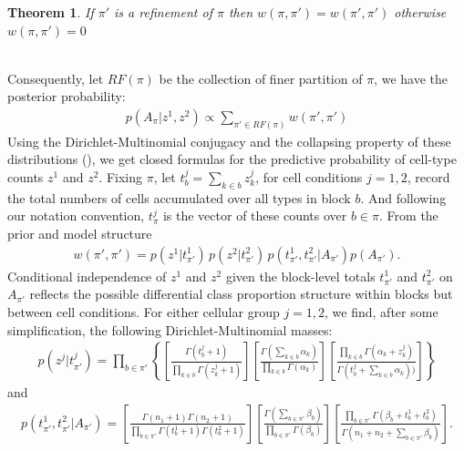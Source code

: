 \documentclass[11pt]{amsart}
\newtheorem{theorem}{Theorem}
\begin{document}
\begin{theorem}
If $\pi'$ is a refinement of $\pi$ then $w(\pi,\pi') = w(\pi', \pi')$ otherwise $w(\pi,\pi') = 0$
\end{theorem}
\hfill\\
Consequently, let $RF(\pi)$ be the collection of finer partition of $\pi$, we have 
the posterior probability: 
\[
\begin{split}
p(A_\pi | z^1,z^2)\propto  \sum_{\pi' \in RF(\pi)} w(\pi',\pi')
\end{split}
\]
Using the Dirichlet-Multinomial conjugacy and the collapsing property of
these distributions (\cite{ref:Dickey}), we get closed formulas for the predictive
probability of cell-type counts $z^1$ and $z^2$.  Fixing $\pi$,
let $t^j_b = \sum_{k\in b} z^j_k$, for cell conditions $j=1,2$, 
record the total numbers of cells accumulated over all types in block $b$.
And following our notation convention, $t^j_\pi$ is the vector of these
counts over $b \in \pi$.  From the prior and model structure
\begin{eqnarray*}
w(\pi', \pi') = p(z^1 | t^1_{\pi'})\, p(z^2|  t^2_{\pi'} )
 \, p( t^1_{\pi'}, t^2_{\pi'} | A_{\pi'} ) p(A_{\pi'}).
\end{eqnarray*}
Conditional independence of $z^1$ and $z^2$ given the block-level totals
$t^1_{\pi'}$ and $t^2_{\pi'}$ on $A_{\pi'}$ reflects the possible differential 
class proportion structure within blocks but between cell conditions.
For either cellular group $j=1,2$,
we find, after some simplification, the following Dirichlet-Multinomial masses: 
\begin{align}
p(z^j|t^j_{\pi'}) = \prod_{b \in \pi'} \left\{
\left[ \frac{ \Gamma(t^j_b +1 ) }{\prod_{k \in b} \Gamma( z^j_k + 1 ) } 
\right]
\left[ \frac{\Gamma( \sum_{k \in b} \alpha_k )}{
		\prod_{k\in b} \Gamma( \alpha_k ) } \right] 
       \left[        \frac{ \prod_{k \in b} \Gamma(\alpha_k + z^j_k)  }{
		\Gamma(t^j_b + \sum_{k\in b} \alpha_k ) )}\right]
 \right\}
\end{align}
and
\begin{align}
p(t^1_{\pi'},t^2_{\pi'}| A_{\pi'}) =
 \left[ \frac{ \Gamma(n_1+1) \Gamma(n_2+1) }{ \prod_{b \in \pi'} \Gamma(t^1_b+1) 
   \Gamma( t^2_b + 1 )} \right] 
\left[ \frac{\Gamma( \sum_{b \in \pi'} \beta_b  )}{
   \prod_{b \in \pi'} \Gamma(\beta_b )} \right] 
 \left[ \frac{ \prod_{b \in \pi'} \Gamma( \beta_b + t^1_b + t^2_b )}{
	\Gamma( n_1 + n_2 + \sum_{b \in \pi'} \beta_b  )} \right].
\end{align}
\hfill\\
\end{document}
